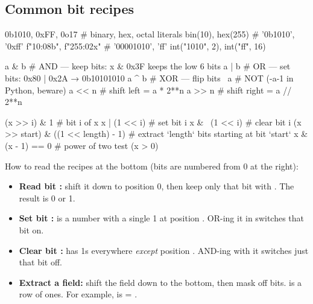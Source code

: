 \documentclass[10pt,a4paper]{article}
\begin{document}
\subsection{Common bit recipes}
\begin{pycode}
0b1010, 0xFF, 0o17          # binary, hex, octal literals
bin(10), hex(255)           # '0b1010', '0xff'
f"{10:08b}", f"{255:02x}"   # '00001010', 'ff'
int("1010", 2), int("ff", 16)

a & b     # AND  — keep bits:      x & 0x3F  keeps the low 6 bits
a | b     # OR   — set bits:       0x80 | 0x2A  → 0b10101010
a ^ b     # XOR  — flip bits
~a        # NOT  (-a-1 in Python, beware)
a << n    # shift left  = a * 2**n
a >> n    # shift right = a // 2**n

(x >> i) & 1            # bit i of x
x | (1 << i)            # set bit i
x & ~(1 << i)           # clear bit i
(x >> start) & ((1 << length) - 1)   # extract `length` bits starting at bit `start`
x & (x - 1) == 0        # power of two test (x > 0)
\end{pycode}
How to read the recipes at the bottom (bits are numbered from 0 at the right):
\begin{itemize}
\item \textbf{Read bit :} shift it down to position 0, then keep only that bit with . The result is 0 or 1.
\item \textbf{Set bit :}  is a number with a single 1 at position . OR-ing it in switches that bit on.
\item \textbf{Clear bit :}  has 1s everywhere \emph{except} position . AND-ing with it switches just that bit off.
\item \textbf{Extract a field:} shift the field down to the bottom, then mask off  bits.  is a row of  ones. For example,  is  = .
\end{itemize}
\end{document}

